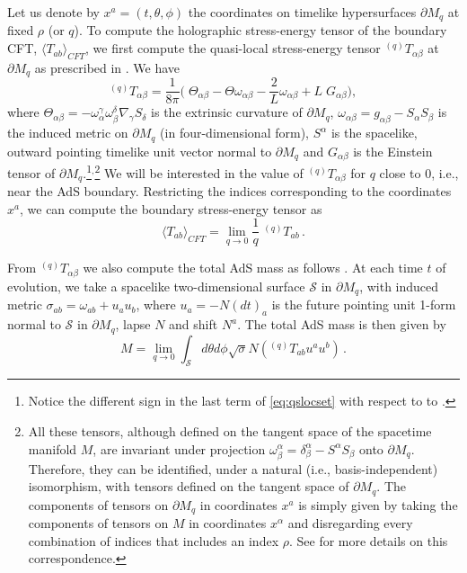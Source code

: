 \documentclass[aps,letterpaper,twocolumn,nofootinbib]{revtex4}
\numberwithin{equation}{section}
\begin{document}
Let us denote by $x^a=(t,\theta,\phi)$ the coordinates on timelike hypersurfaces $\partial M_q$ at fixed $\rho$ (or $q$).
To compute the holographic stress-energy tensor of the boundary CFT, $\langle T_{ab}\rangle_{CFT}$, we first compute the quasi-local stress-energy tensor $^{(q)}T_{\alpha\beta}$ at $\partial M_q$ as prescribed in \cite{Balasubramanian:1999re}. 
We have
\begin{equation}
\label{eq:qslocset}
^{(q)}T_{\alpha\beta}=\frac{1}{8\pi}\biggl(\;  \Theta_{\alpha\beta}-\Theta \omega_{\alpha\beta}-\frac{2}{L}\omega_{\alpha\beta}+L \;G_{\alpha\beta} \biggr),
\end{equation}
where $\Theta_{\alpha\beta}=-\omega^\gamma_{\alpha}\omega^\delta_\beta\nabla_{\gamma}S_{\delta}$ is the extrinsic curvature of $\partial M_q$, $\omega_{\alpha\beta}=g_{\alpha\beta}-S_\alpha S_\beta$ is the induced metric on $\partial M_q$ (in four-dimensional form), $S^\alpha$ is the spacelike, outward pointing timelike unit vector normal to $\partial M_q$ and $G_{\alpha\beta}$ is the Einstein tensor of $\partial M_q$.\footnote{Notice the different sign in the last term of \eqref{eq:qslocset} with respect to to \cite{Balasubramanian:1999re}.}$^{,}$\footnote{All these tensors, although defined on the tangent space of the spacetime manifold $M$, are invariant under projection $\omega^\alpha_{\beta}=\delta^\alpha_{\beta}-S^\alpha S_\beta$ onto $\partial M_q$. Therefore, they can be identified, under a natural (i.e., basis-independent) isomorphism, with tensors defined on the tangent space of $\partial M_q$. The components of tensors on $\partial M_q$ in coordinates $x^a$ is simply given by taking the components of tensors on $M$ in coordinates $x^\alpha$ and disregarding every combination of indices that includes an index $\rho$. See \cite{Hawking:1973uf} for more details on this correspondence.} We will be interested in the value of $^{(q)}T_{\alpha\beta}$ for $q$ close to 0, i.e., near the AdS boundary.
Restricting the indices corresponding to the coordinates $x^a$, we can compute the boundary stress-energy tensor as
\begin{equation}
\langle T_{ab}\rangle_{CFT}=\lim_{q\to0}\frac{1}{q} \;^{(q)}T_{ab}\,.
\end{equation}

From $^{(q)}T_{\alpha\beta}$ we also compute the total AdS mass as follows \cite{Balasubramanian:1999re}. At each time $t$ of evolution, we take a spacelike two-dimensional surface $\mathcal{S}$ in $\partial M_q$, with induced metric $\sigma_{ab}=\omega_{ab}+u_a u_b$, where $u_a=-N(dt)_a$ is the future pointing unit 1-form normal to $\mathcal{S}$ in $\partial M_q$, lapse $N$ and shift $N^a$. The total AdS mass is then given by
\begin{equation}
M=\lim_{q\to0}\int_{\mathcal{S}} d\theta d\phi \sqrt{\sigma} N ( ^{(q)}T_{ab} u^a u^b)\,.
\end{equation}
\end{document}
